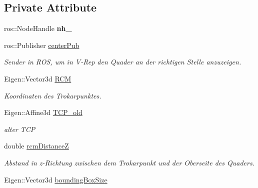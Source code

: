 \subsection*{Private Attribute}
\begin{DoxyCompactItemize}
\item 
\hypertarget{classBoundingBox_ac9681b03b7864b0cbc2537f643ce007d}{ros\-::\-Node\-Handle {\bfseries nh\-\_\-}}\label{classBoundingBox_ac9681b03b7864b0cbc2537f643ce007d}

\item 
\hypertarget{classBoundingBox_aa4451c8bf589cd4a549be53756bd0ae8}{ros\-::\-Publisher \hyperlink{classBoundingBox_aa4451c8bf589cd4a549be53756bd0ae8}{center\-Pub}}\label{classBoundingBox_aa4451c8bf589cd4a549be53756bd0ae8}

\begin{DoxyCompactList}\small\item\em Sender in R\-O\-S, um in V-\/\-Rep den Quader an der richtigen Stelle anzuzeigen. \end{DoxyCompactList}\item 
\hypertarget{classBoundingBox_a1aefa364b31d2a36fce50b79edbb1116}{Eigen\-::\-Vector3d \hyperlink{classBoundingBox_a1aefa364b31d2a36fce50b79edbb1116}{R\-C\-M}}\label{classBoundingBox_a1aefa364b31d2a36fce50b79edbb1116}

\begin{DoxyCompactList}\small\item\em Koordinaten des Trokarpunktes. \end{DoxyCompactList}\item 
\hypertarget{classBoundingBox_a4cc474bf1d1ec1c50fa403e33ac385f1}{Eigen\-::\-Affine3d \hyperlink{classBoundingBox_a4cc474bf1d1ec1c50fa403e33ac385f1}{T\-C\-P\-\_\-old}}\label{classBoundingBox_a4cc474bf1d1ec1c50fa403e33ac385f1}

\begin{DoxyCompactList}\small\item\em alter T\-C\-P \end{DoxyCompactList}\item 
\hypertarget{classBoundingBox_a3ea0aa423615b74d9244c94fb7a33870}{double \hyperlink{classBoundingBox_a3ea0aa423615b74d9244c94fb7a33870}{rcm\-Distance\-Z}}\label{classBoundingBox_a3ea0aa423615b74d9244c94fb7a33870}

\begin{DoxyCompactList}\small\item\em Abstand in z-\/\-Richtung zwischen dem Trokarpunkt und der Oberseite des Quaders. \end{DoxyCompactList}\item 
\hypertarget{classBoundingBox_a0331404e2b255f97beba34733d15f52e}{Eigen\-::\-Vector3d \hyperlink{classBoundingBox_a0331404e2b255f97beba34733d15f52e}{bounding\-Box\-Size}}\label{classBoundingBox_a0331404e2b255f97beba34733d15f52e}


\end{DoxyCompactItemize}
